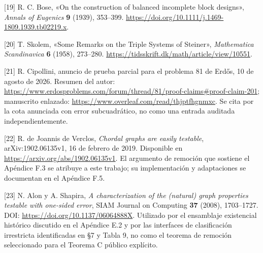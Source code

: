 \documentclass[spanish,11pt,a4paper]{article}
\begin{document}
{[}19{]} R. C. Bose, «On the construction of balanced incomplete block designs», \emph{Annals of Eugenics} \textbf{9} (1939), 353--399. \url{https://doi.org/10.1111/j.1469-1809.1939.tb02219.x}.

{[}20{]} T. Skolem, «Some Remarks on the Triple Systems of Steiner», \emph{Mathematica Scandinavica} \textbf{6} (1958), 273--280. \url{https://tidsskrift.dk/math/article/view/10551}.

{[}21{]} R. Cipollini, anuncio de prueba parcial para el problema 81 de Erdős, 10 de agosto de 2026. Resumen del autor: \url{https://www.erdosproblems.com/forum/thread/81/proof-claims\#proof-claim-201}; manuscrito enlazado: \url{https://www.overleaf.com/read/thjptfhgnmxc}. Se cita por la cota anunciada con error subcuadrático, no como una entrada auditada independientemente.

{[}22{]} R. de Joannis de Verclos, \emph{Chordal graphs are easily testable}, arXiv:1902.06135v1, 16 de febrero de 2019. Disponible en \url{https://arxiv.org/abs/1902.06135v1}. El argumento de remoción que sostiene el Apéndice F.3 se atribuye a este trabajo; su implementación y adaptaciones se documentan en el Apéndice F.5.

{[}23{]} N. Alon y A. Shapira, \emph{A characterization of the (natural) graph properties testable with one-sided error}, SIAM Journal on Computing \textbf{37} (2008), 1703--1727. DOI: \url{https://doi.org/10.1137/06064888X}. Utilizado por el ensamblaje existencial histórico discutido en el Apéndice E.2 y por las interfaces de clasificación irrestricta identificadas en §7 y Tabla 9, no como el teorema de remoción seleccionado para el Teorema C público explícito.

\endgroup
\end{document}
